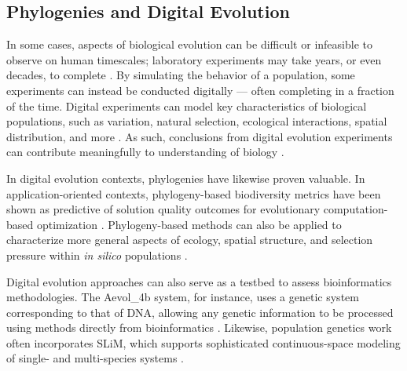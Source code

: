 

\subsection{Phylogenies and Digital Evolution} \label{sec:introduction:digital}

In some cases, aspects of biological evolution can be difficult or infeasible to observe on human timescales; laboratory experiments may take years, or even decades, to complete \citep{wiser2013long,Stroud2025}.
By simulating the behavior of a population, some experiments can instead be conducted digitally --- often completing in a fraction of the time.
Digital experiments can model key characteristics of biological populations, such as variation, natural selection, ecological interactions, spatial distribution, and more \citep{dolson2021digital,haller2023slim}.
As such, conclusions from digital evolution experiments can contribute meaningfully to understanding of biology \citep{pennock2007models}.

In digital evolution contexts, phylogenies have likewise proven valuable.
In application-oriented contexts, phylogeny-based biodiversity metrics have been shown as predictive of solution quality outcomes for evolutionary computation-based optimization \citep{hernandez2022phylogenetic}.
Phylogeny-based methods can also be applied to characterize more general aspects of ecology, spatial structure, and selection pressure within \textit{in silico} populations \citep{moreno2023toward}.

Digital evolution approaches can also serve as a testbed to assess bioinformatics methodologies.
The Aevol\_4b system, for instance, uses a genetic system corresponding to that of DNA, allowing any genetic information to be processed using methods directly from bioinformatics \citep{daudey2024aevol}.
Likewise, population genetics work often incorporates SLiM, which supports sophisticated continuous-space modeling of single- and multi-species systems \citep{haller2023slim}.

